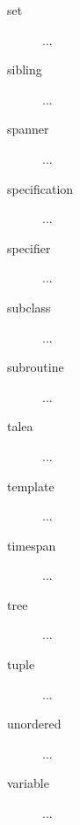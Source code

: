 \begin{description}
\item[set] ...

\item[sibling] ...

\item[spanner] ...

\item[specification] ...

\item[specifier] ...

\item[subclass] ...

\item[subroutine] ...

\item[talea] ...

\item[template] ...

\item[timespan] ...

\item[tree] ...

\item[tuple] ...

\item[unordered] ...

\item[variable] ...

\end{description}